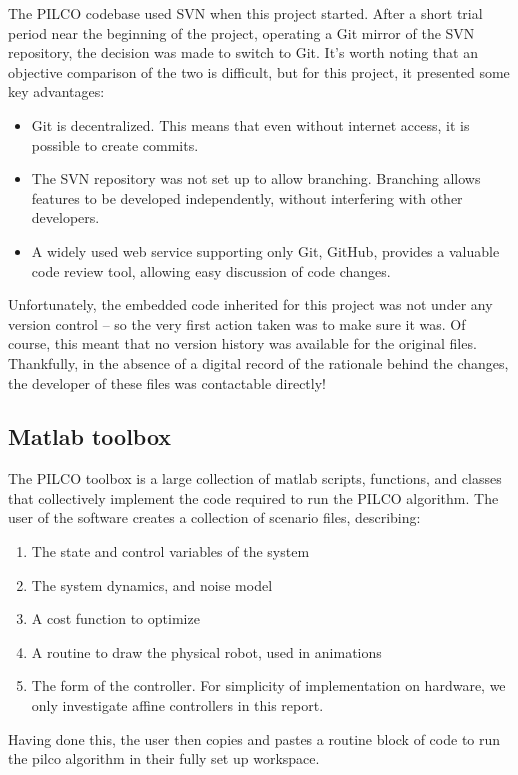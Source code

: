 \documentclass[main.tex]{subfiles}
\begin{document}
	The PILCO codebase used SVN when this project started. After a short trial period near the beginning of the project, operating a Git mirror of the SVN repository, the decision was made to switch to Git. It's worth noting that an objective comparison of the two is difficult, but for this project, it presented some key advantages:
	\begin{itemize}
		\item
			Git is decentralized. This means that even without internet access, it is possible to create commits.

		\item
			The SVN repository was not set up to allow branching. Branching allows features to be developed independently, without interfering with other developers.

		\item
			A widely used web service supporting only Git, GitHub, provides a valuable code review tool, allowing easy discussion of code changes.
	\end{itemize}

	Unfortunately, the embedded code inherited for this project was not under any version control -- so the very first action taken was to make sure it was.
	Of course, this meant that no version history was available for the original files. Thankfully, in the absence of a digital record of the rationale behind the changes, the developer of these files was contactable directly!

	\subsection{Matlab toolbox}

	The PILCO toolbox is a large collection of matlab scripts, functions, and classes that collectively implement the code required to run the PILCO algorithm. The user of the software creates a collection of scenario files, describing:
	\begin{enumerate}[noitemsep]
		\item The state and control variables of the system
		\item The system dynamics, and noise model
		\item A cost function to optimize
		\item A routine to draw the physical robot, used in animations
		\item The form of the controller. For simplicity of implementation on hardware, we only investigate affine controllers in this report.
	\end{enumerate}
	Having done this, the user then copies and pastes a routine block of code to run the pilco algorithm in their fully set up workspace.
\end{document}
